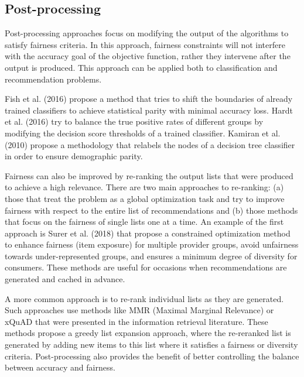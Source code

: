     \subsection{Post-processing}

        Post-processing approaches focus on modifying the output of the algorithms to satisfy fairness criteria. In this approach, fairness constraints will not interfere with the accuracy goal of the objective function, rather they intervene after the output is produced. This approach can be applied both to classification and recommendation problems.
        
        Fish et al. (2016) \cite{fish2016confidence} propose a method that tries to shift the boundaries of already trained classifiers to achieve statistical parity with minimal accuracy loss. Hardt et al. (2016) \cite{hardt2016equality} try to balance the true positive rates of different groups by modifying the decision score thresholds of a trained classifier. Kamiran et al.(2010) \cite{kamiran2010discrimination} propose a methodology that relabels the nodes of a decision tree classifier in order to ensure demographic parity.

        Fairness can also be improved by re-ranking the output lists that were produced to achieve a high relevance. There are two main approaches to re-ranking: (a) those that treat the problem as a global optimization task and try to improve fairness with respect to the entire list of recommendations and (b) those methods that focus on the fairness of single lists one at a time. An example of the first approach is Surer et al. (2018) \cite{surer2018multistakeholder} that propose a constrained optimization method to enhance fairness (item exposure) for multiple provider groups, avoid unfairness towards under-represented groups, and ensures a minimum degree of diversity for consumers. These methods are useful for occasions when recommendations are generated and cached in advance.

        A more common approach is to re-rank individual lists as they are generated. Such approaches use methods like MMR (Maximal Marginal Relevance) \cite{carbonell1998use} or xQuAD \cite{santos2010explicit} that were presented in the information retrieval literature. These methods propose a greedy list expansion approach, where the re-reranked list is generated by adding new items to this list where it satisfies a fairness or diversity criteria. Post-processing also provides the benefit of better controlling the balance between accuracy and fairness. 
        
